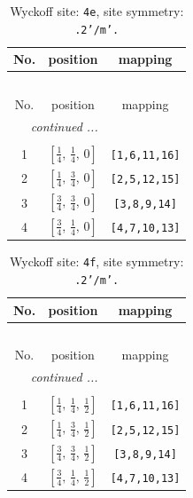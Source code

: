 \documentclass[fleqn,8pt]{jsarticle}
\begin{document}
\renewcommand{\arraystretch}{1.2}
\begin{longtable}{ccc}
\caption{Wyckoff site: {\tt 4e}, site symmetry: {\tt .2'/m'.}}
 \\
 \hline \hline
No. & position & mapping \\ \hline \endfirsthead

\multicolumn{2}{l}{\tablename\ \thetable{}} \\
 \hline \hline
No. & position & mapping \\ \hline \endhead

 \hline \hline
\multicolumn{2}{r}{\footnotesize\it continued ...} \\ \endfoot

 \hline \hline
\multicolumn{2}{r}{} \\ \endlastfoot

1 & $\left[ \frac{1}{4},\, \frac{1}{4},\, 0 \right]$ & {\tt [1,6,11,16]} \\ \hline
2 & $\left[ \frac{1}{4},\, \frac{3}{4},\, 0 \right]$ & {\tt [2,5,12,15]} \\ \hline
3 & $\left[ \frac{3}{4},\, \frac{3}{4},\, 0 \right]$ & {\tt [3,8,9,14]} \\ \hline
4 & $\left[ \frac{3}{4},\, \frac{1}{4},\, 0 \right]$ & {\tt [4,7,10,13]} \\
\end{longtable}
\renewcommand{\arraystretch}{1.2}
\begin{longtable}{ccc}
\caption{Wyckoff site: {\tt 4f}, site symmetry: {\tt .2'/m'.}}
 \\
 \hline \hline
No. & position & mapping \\ \hline \endfirsthead

\multicolumn{2}{l}{\tablename\ \thetable{}} \\
 \hline \hline
No. & position & mapping \\ \hline \endhead

 \hline \hline
\multicolumn{2}{r}{\footnotesize\it continued ...} \\ \endfoot

 \hline \hline
\multicolumn{2}{r}{} \\ \endlastfoot

1 & $\left[ \frac{1}{4},\, \frac{1}{4},\, \frac{1}{2} \right]$ & {\tt [1,6,11,16]} \\ \hline
2 & $\left[ \frac{1}{4},\, \frac{3}{4},\, \frac{1}{2} \right]$ & {\tt [2,5,12,15]} \\ \hline
3 & $\left[ \frac{3}{4},\, \frac{3}{4},\, \frac{1}{2} \right]$ & {\tt [3,8,9,14]} \\ \hline
4 & $\left[ \frac{3}{4},\, \frac{1}{4},\, \frac{1}{2} \right]$ & {\tt [4,7,10,13]} \\
\end{longtable}
\end{document}
